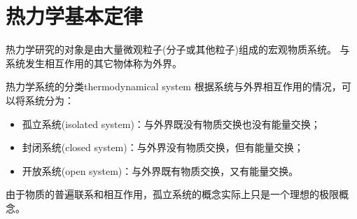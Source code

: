 
\chapter{热力学基本定律}


热力学研究的对象是由大量微观粒子(分子或其他粒子)组成的宏观物质系统。
与系统发生相互作用的其它物体称为外界。

\begin{definition}
	{热力学系统的分类}{thermodynamical system}
	根据系统与外界相互作用的情况，可以将系统分为：
	\begin{itemize}
		\item 孤立系统(isolated system)：与外界既没有物质交换也没有能量交换；
		\item 封闭系统(closed system)：与外界没有物质交换，但有能量交换；
		\item 开放系统(open system)：与外界既有物质交换，又有能量交换。
	\end{itemize}
\end{definition}

\begin{remark}
	由于物质的普遍联系和相互作用，孤立系统的概念实际上只是一个理想的极限概念。
\end{remark}


